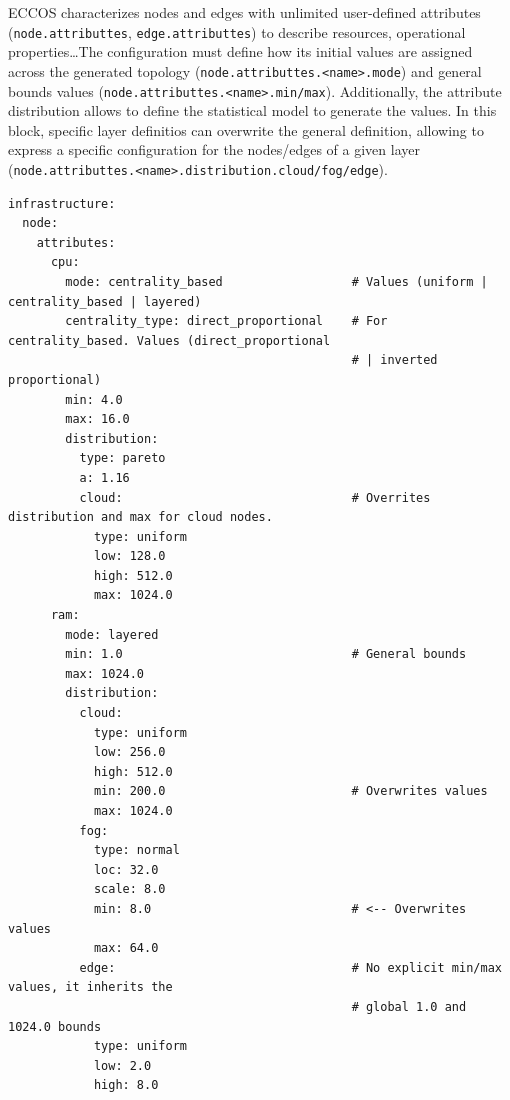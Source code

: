 \documentclass[ASNA]{USG} %
\begin{document}
\textsc{ECCOS} characterizes nodes and edges with unlimited user-defined attributes (\texttt{node.attributtes}, \texttt{edge.attributtes}) to describe resources, operational properties\ldots The configuration must define how its initial values are assigned across the generated topology (\texttt{node.attributtes.<name>.mode}) and general bounds values (\texttt{node.attributtes.<name>.min/max}). Additionally, the attribute distribution allows to define the statistical model to generate the values. In this block, specific layer definitios can overwrite the general definition, allowing to express a specific configuration for the nodes/edges of a given layer (\texttt{node.attributtes.<name>.distribution.cloud/fog/edge}). 



\begin{lstlisting}[caption={YAML configuration for the attributes definition of the infrastructure entities.},label=lst:user_event, basicstyle=\fontsize{8}{10}\selectfont\ttfamily]
infrastructure:
  node:
    attributes:
      cpu:
        mode: centrality_based                  # Values (uniform | centrality_based | layered)
        centrality_type: direct_proportional    # For centrality_based. Values (direct_proportional
                                                # | inverted proportional)
        min: 4.0
        max: 16.0
        distribution:
          type: pareto
          a: 1.16
          cloud:                                # Overrites distribution and max for cloud nodes.
            type: uniform
            low: 128.0
            high: 512.0
            max: 1024.0    
      ram:
        mode: layered
        min: 1.0                                # General bounds
        max: 1024.0         
        distribution:
          cloud:
            type: uniform
            low: 256.0
            high: 512.0
            min: 200.0                          # Overwrites values
            max: 1024.0
          fog:
            type: normal
            loc: 32.0
            scale: 8.0
            min: 8.0                            # <-- Overwrites values
            max: 64.0
          edge:                                 # No explicit min/max values, it inherits the 
                                                # global 1.0 and 1024.0 bounds
            type: uniform
            low: 2.0
            high: 8.0
            
\end{lstlisting}

\label{anex_infrastructureevents}
\end{document}
